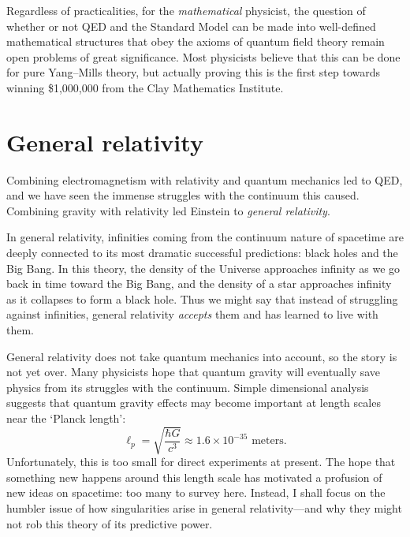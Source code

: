 \documentclass[12pt]{article}
\begin{document}
Regardless of practicalities, for the \emph{mathematical} physicist, the question of whether or not QED and the Standard Model can be made into well-defined mathematical structures that obey the axioms of quantum field theory remain open problems of great significance.   Most physicists believe that this can be done for pure Yang--Mills theory, but actually proving this is the first step towards winning \$1,000,000 from the Clay Mathematics Institute.

\section{General relativity}

Combining electromagnetism with relativity and quantum mechanics led to QED, and we have seen the immense struggles with the continuum this caused.   Combining gravity with relativity led Einstein to \emph{general relativity}.   

In general relativity, infinities coming from the continuum nature of spacetime are deeply connected to its most dramatic successful predictions: black holes and the Big Bang.   In this theory, the density of the Universe approaches infinity as we go back in time toward the Big Bang, and the density of a star approaches infinity as it collapses to form a black hole.   Thus we might say that instead of struggling against infinities, general relativity \emph{accepts} them and has learned to live with them. 

General relativity does not take quantum mechanics into account, so the story is not  yet over.   Many physicists hope that quantum gravity will eventually save physics from its struggles with the continuum.   Simple dimensional analysis suggests that quantum gravity effects may become important at length scales near the `Planck length':
\[                  \ell_p = \sqrt{\frac{\hbar G}{c^3}} \approx 1.6 \times 10^{-35} \textrm{ meters}  .\]
Unfortunately, this is too small for direct experiments at present.  The hope that something new happens around this length scale has motivated a profusion of new ideas on spacetime: too many to survey here.  Instead, I shall focus on the humbler issue of how singularities arise in general relativity---and why they might not rob this theory of its predictive power.
\end{document}
